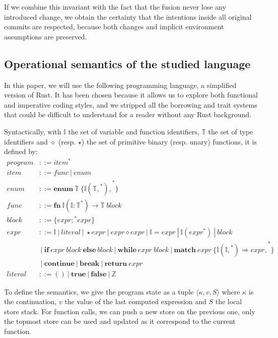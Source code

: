 \documentclass[a4paper,11pt]{article}
\newcommand\typsep{\ |\ }
\begin{document}
If we combine this invariant with the fact that the fusion never lose any introduced change, we obtain the certainty that the intentions inside all original commits are respected, because both changes and implicit environment assumptions are preserved.

\subsection{Operational semantics of the studied language}
In this paper, we will use the following programming language, a simplified version of Rust. It has been chosen because it allows us to explore both functional and imperative coding styles, and we stripped all the borrowing and trait systems that could be difficult to understand for a reader without any Rust background.

\newcommand{\ident}{\mathbb{I}}
\newcommand{\typ}{\mathbb{T}}
Syntactically, with $\ident$ the set of variable and function identifiers, $\typ$ the set of type identifiers and $\diamond$ (resp. $\star$) the set of primitive binary (resp. unary) functions, it is defined by:
\begin{align*}
program &::= \boxed{item}^*\\
item &::= func \typsep enum\\
enum &::= \mathbf{enum}\ \typ\ \{ \boxed{\ident(\boxed{\typ,}^*),}^* \}\\
func &::= \mathbf{fn}\ \ident(\boxed{\ident: \typ}^*) \rightarrow \typ\ block\\
block &::= \{ \boxed{expr;}^* expr \}\\
expr &::= \ident \typsep literal \typsep \star expr \typsep expr \diamond expr \typsep \ident = expr \typsep \ident(\boxed{expr}^*) \typsep block\\
&\typsep \mathbf{if}\ expr\ block\ \mathbf{else}\ block \typsep \mathbf{while}\ expr\ block \typsep \mathbf{match}\ expr\ \{ \boxed{\ident(\boxed{\ident,}^*) \Rightarrow expr,}^* \}\\
&\typsep \mathbf{continue} \typsep \mathbf{break} \typsep \textbf{return}\ expr\\
literal &::= () \typsep \mathbf{true} \typsep \mathbf {false} \typsep \mathbb{Z}
\end{align*}

To define the semantics, we give the program state as a tuple $\langle\kappa, v, S\rangle$ where $\kappa$ is the continuation, $v$ the value of the last computed expression and $S$ the local store stack. For function calls, we can push a new store on the previous one, only the topmost store can be used and updated as it correspond to the current function.
\end{document}
